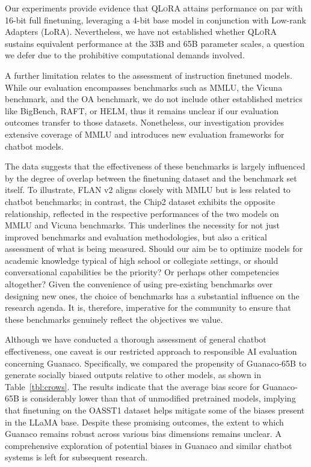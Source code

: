 Our experiments provide evidence that \textsc{QLoRA} attains performance on par with 16-bit full finetuning, leveraging a 4-bit base model in conjunction with Low-rank Adapters (LoRA). Nevertheless, we have not established whether \textsc{QLoRA} sustains equivalent performance at the 33B and 65B parameter scales, a question we defer due to the prohibitive computational demands involved.

A further limitation relates to the assessment of instruction finetuned models. While our evaluation encompasses benchmarks such as MMLU, the Vicuna benchmark, and the OA benchmark, we do not include other established metrics like BigBench, RAFT, or HELM, thus it remains unclear if our evaluation outcomes transfer to those datasets. Nonetheless, our investigation provides extensive coverage of MMLU and introduces new evaluation frameworks for chatbot models.

The data suggests that the effectiveness of these benchmarks is largely influenced by the degree of overlap between the finetuning dataset and the benchmark set itself. To illustrate, FLAN v2 aligns closely with MMLU but is less related to chatbot benchmarks; in contrast, the Chip2 dataset exhibits the opposite relationship, reflected in the respective performances of the two models on MMLU and Vicuna benchmarks. This underlines the necessity for not just improved benchmarks and evaluation methodologies, but also a critical assessment of what is being measured. Should our aim be to optimize models for academic knowledge typical of high school or collegiate settings, or should conversational capabilities be the priority? Or perhaps other competencies altogether? Given the convenience of using pre-existing benchmarks over designing new ones, the choice of benchmarks has a substantial influence on the research agenda. It is, therefore, imperative for the community to ensure that these benchmarks genuinely reflect the objectives we value.

Although we have conducted a thorough assessment of general chatbot effectiveness, one caveat is our restricted approach to responsible AI evaluation concerning {Guanaco}. Specifically, we compared the propensity of {Guanaco}-65B to generate socially biased outputs relative to other models, as shown in Table~\ref{tbl:crows}. The results indicate that the average bias score for {Guanaco}-65B is considerably lower than that of unmodified pretrained models, implying that finetuning on the OASST1 dataset helps mitigate some of the biases present in the LLaMA base. Despite these promising outcomes, the extent to which {Guanaco} remains robust across various bias dimensions remains unclear. A comprehensive exploration of potential biases in {Guanaco} and similar chatbot systems is left for subsequent research.

